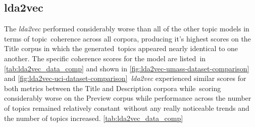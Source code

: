 \documentclass[letterpaper,12pt]{article}
\begin{document}
\subsection{lda2vec}
The \emph{lda2vec} performed considerably worse than all of the other topic models in terms of topic\
coherence across all corpora, producing it's highest scores on the Title corpus in which the generated\
topics appeared nearly identical to one another. The specific coherence scores for the model are listed\
in \ref{tab:lda2vec_data_comp} and shown in \ref{fig:lda2vec-umass-dataset-comparison} and \ref{fig:lda2vec-uci-dataset-comparison}\
\emph{lda2vec} experienced similar scores for both metrics between the Title and Description corpora while\
scoring considerably worse on the Preview corpus while performance across the number of topics remained relatively constant\
without any really noticeable trends and the number of topics increased.
\ref{tab:lda2vec_data_comp}
\end{document}
